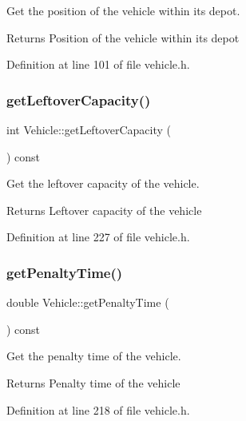 Get the position of the vehicle within its depot. \begin{DoxyReturn}{Returns}
Position of the vehicle within its depot 
\end{DoxyReturn}


Definition at line 101 of file vehicle.\+h.

\mbox{\label{class_vehicle_afd53834ae8fc6fea1a972a864b939a36}} 
\subsubsection{\texorpdfstring{get\+Leftover\+Capacity()}{getLeftoverCapacity()}}
{\footnotesize\ttfamily int Vehicle\+::get\+Leftover\+Capacity (\begin{DoxyParamCaption}{ }\end{DoxyParamCaption}) const\hspace{0.3cm}{\ttfamily [inline]}}

Get the leftover capacity of the vehicle. \begin{DoxyReturn}{Returns}
Leftover capacity of the vehicle 
\end{DoxyReturn}


Definition at line 227 of file vehicle.\+h.

\mbox{\label{class_vehicle_aa0406e5066d59ee8921e6f8871cbecd7}} 
\subsubsection{\texorpdfstring{get\+Penalty\+Time()}{getPenaltyTime()}}
{\footnotesize\ttfamily double Vehicle\+::get\+Penalty\+Time (\begin{DoxyParamCaption}{ }\end{DoxyParamCaption}) const\hspace{0.3cm}{\ttfamily [inline]}}

Get the penalty time of the vehicle. \begin{DoxyReturn}{Returns}
Penalty time of the vehicle 
\end{DoxyReturn}


Definition at line 218 of file vehicle.\+h.


